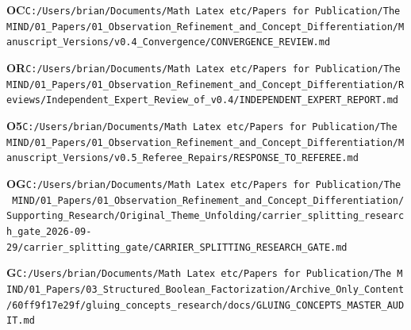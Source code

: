 \documentclass[10pt,letterpaper]{article}
\begin{document}
\noindent\textbf{OC}\quad \texttt{C:/\allowbreak{}Users/\allowbreak{}brian/\allowbreak{}Documents/\allowbreak{}Math\ Latex\ etc/\allowbreak{}Papers\ for\ Publication/\allowbreak{}The\ MIND/\allowbreak{}01\_\allowbreak{}Papers/\allowbreak{}01\_\allowbreak{}Observation\_\allowbreak{}Refinement\_\allowbreak{}and\_\allowbreak{}Concept\_\allowbreak{}Differentiation/\allowbreak{}Manuscript\_\allowbreak{}Versions/\allowbreak{}v0.4\_\allowbreak{}Convergence/\allowbreak{}CONVERGENCE\_\allowbreak{}REVIEW.md}\par
\noindent\textbf{OR}\quad \texttt{C:/\allowbreak{}Users/\allowbreak{}brian/\allowbreak{}Documents/\allowbreak{}Math\ Latex\ etc/\allowbreak{}Papers\ for\ Publication/\allowbreak{}The\ MIND/\allowbreak{}01\_\allowbreak{}Papers/\allowbreak{}01\_\allowbreak{}Observation\_\allowbreak{}Refinement\_\allowbreak{}and\_\allowbreak{}Concept\_\allowbreak{}Differentiation/\allowbreak{}Reviews/\allowbreak{}Independent\_\allowbreak{}Expert\_\allowbreak{}Review\_\allowbreak{}of\_\allowbreak{}v0.4/\allowbreak{}INDEPENDENT\_\allowbreak{}EXPERT\_\allowbreak{}REPORT.md}\par
\noindent\textbf{O5}\quad \texttt{C:/\allowbreak{}Users/\allowbreak{}brian/\allowbreak{}Documents/\allowbreak{}Math\ Latex\ etc/\allowbreak{}Papers\ for\ Publication/\allowbreak{}The\ MIND/\allowbreak{}01\_\allowbreak{}Papers/\allowbreak{}01\_\allowbreak{}Observation\_\allowbreak{}Refinement\_\allowbreak{}and\_\allowbreak{}Concept\_\allowbreak{}Differentiation/\allowbreak{}Manuscript\_\allowbreak{}Versions/\allowbreak{}v0.5\_\allowbreak{}Referee\_\allowbreak{}Repairs/\allowbreak{}RESPONSE\_\allowbreak{}TO\_\allowbreak{}REFEREE.md}\par
\noindent\textbf{OG}\quad \texttt{C:/\allowbreak{}Users/\allowbreak{}brian/\allowbreak{}Documents/\allowbreak{}Math\ Latex\ etc/\allowbreak{}Papers\ for\ Publication/\allowbreak{}The\ MIND/\allowbreak{}01\_\allowbreak{}Papers/\allowbreak{}01\_\allowbreak{}Observation\_\allowbreak{}Refinement\_\allowbreak{}and\_\allowbreak{}Concept\_\allowbreak{}Differentiation/\allowbreak{}Supporting\_\allowbreak{}Research/\allowbreak{}Original\_\allowbreak{}Theme\_\allowbreak{}Unfolding/\allowbreak{}carrier\_\allowbreak{}splitting\_\allowbreak{}research\_\allowbreak{}gate\_\allowbreak{}2026-\allowbreak{}09-\allowbreak{}29/\allowbreak{}carrier\_\allowbreak{}splitting\_\allowbreak{}gate/\allowbreak{}CARRIER\_\allowbreak{}SPLITTING\_\allowbreak{}RESEARCH\_\allowbreak{}GATE.md}\par
\noindent\textbf{G}\quad \texttt{C:/\allowbreak{}Users/\allowbreak{}brian/\allowbreak{}Documents/\allowbreak{}Math\ Latex\ etc/\allowbreak{}Papers\ for\ Publication/\allowbreak{}The\ MIND/\allowbreak{}01\_\allowbreak{}Papers/\allowbreak{}03\_\allowbreak{}Structured\_\allowbreak{}Boolean\_\allowbreak{}Factorization/\allowbreak{}Archive\_\allowbreak{}Only\_\allowbreak{}Content/\allowbreak{}60ff9f17e29f/\allowbreak{}gluing\_\allowbreak{}concepts\_\allowbreak{}research/\allowbreak{}docs/\allowbreak{}GLUING\_\allowbreak{}CONCEPTS\_\allowbreak{}MASTER\_\allowbreak{}AUDIT.md}\par
\end{document}
